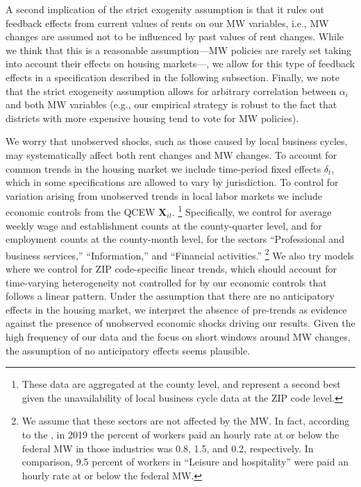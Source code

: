 A second implication of the strict exogenity assumption is that it rules out 
feedback effects from current values of rents on our MW variables, 
i.e., MW changes are assumed not to be influenced by past values of rent changes.
While we think that this is a reasonable assumption---MW policies are rarely 
set taking into account their effects on housing markets---, we allow for this 
type of feedback effects in a specification described in the following subsection.
Finally, we note that the strict exogeneity assumption allows for arbitrary 
correlation between $\alpha_i$ and both MW variables 
(e.g., our empirical strategy is robust to the fact that districts with more
expensive housing tend to vote for MW policies).

We worry that unobserved shocks, such as those caused by local business cycles, 
may systematically affect both rent changes and MW changes.
To account for common trends in the housing market we include time-period 
fixed effects $\delta_t$, which in some specifications are allowed to vary by 
jurisdiction.
To control for variation arising from unobserved trends in local labor markets 
we include economic controls from the QCEW $\mathbf{X}_{it}$.%
\footnote{These data are aggregated at the county level, and represent a second 
best given the unavailability of local business cycle data at the ZIP code 
level.}
Specifically, we control for average weekly wage and establishment counts at the 
county-quarter level, and for employment counts at the county-month level, 
for the sectors ``Professional and business services,'' ``Information,'' and 
``Financial activities.''%
\footnote{We assume that these sectors are not affected by the MW.
In fact, according to the \textcite[][Table 5]{MinWorkersReportBLS}, in 
2019 the percent of workers paid an hourly rate at or below the federal MW 
in those industries was 0.8, 1.5, and 0.2, respectively.
In comparison, 9.5 percent of workers in ``Leisure and hospitality'' were paid 
an hourly rate at or below the federal MW.}
We also try models where we control for ZIP code-specific linear
trends, which should account for time-varying heterogeneity not controlled for 
by our economic controls that follows a linear pattern.
Under the assumption that there are no anticipatory effects in the housing 
market, we interpret the absence of pre-trends as evidence against the presence 
of unobserved economic shocks driving our results.
Given the high frequency of our data and the focus on short windows around 
MW changes, the assumption of no anticipatory effects seems plausible.%
